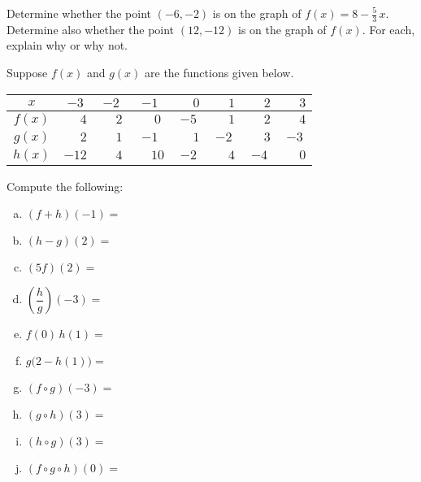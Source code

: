 \documentclass[11pt,letterpaper]{article}
\begin{document}

 Determine whether the point $(-6, -2)$ is on the graph of $f(x)= 8 - \frac{5}{3}\,x$. Determine also whether the point $(12, -12)$ is on the graph of $f(x)$. For each, explain why or why not. 



\newpage



 Suppose $f(x)$ and $g(x)$ are the functions given below. 
        \begin{table}[!ht]
        \centering
        \begin{tabular}{| c || c | c | c | c | c | c | c |} \hline
	$x$ & $-3$ & $-2$ & $-1$ & $\phantom{-}0$ & $\phantom{-}1$ & $\phantom{-}2$ & $\phantom{-}3$ \\ \hline
	$f(x)$ & $\phantom{-1}4$ & $\phantom{-}2$ & $\phantom{-}0$ & $-5$ & $\phantom{-}1$ & $\phantom{-}2$ & $\phantom{-}4$ \\ \hline
	$g(x)$ & $\phantom{-1}2$ & $\phantom{-}1$ & $-1$ & $\phantom{-}1$ & $-2$ & $\phantom{-}3$ & $-3$ \\ \hline
	$h(x)$ & $-12$ & $\phantom{-}4$ & $\phantom{-}10$ & $-2$ & $\phantom{-}4$ & $-4$ & $\phantom{-}0$ \\ \hline
        \end{tabular}
        \end{table}

Compute the following: \pspace
        \begin{enumerate}[(a)]
        \item $(f + h)(-1)=$ \vfill
        \item $(h - g)(2)=$ \vfill
        \item $(5f)(2)=$ \vfill
        \item $\left(\dfrac{h}{g}\right)(-3)=$ \vfill
        \item $f(0)\, h(1)=$ \vfill
        \item $g \big(2 - h(1) \big)=$ \vfill
        \item $(f \circ g)(-3)=$ \vfill
	\item $(g \circ h)(3)=$ \vfill
        \item $(h \circ g)(3)=$ \vfill
	\item $(f \circ g \circ h)(0)=$ \vfill
        \end{enumerate} 



\newpage
\end{document}

